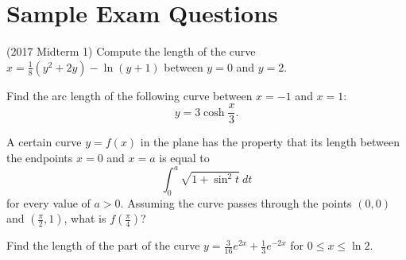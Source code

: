 \documentclass{ximera}
\begin{document}
\section*{Sample Exam Questions}

\begin{question}(2017 Midterm 1)
Compute the length of the curve $x = \frac{1}{8} (y^2 + 2y) - \ln (y+1)$ between $y=0$ and $y = 2$.
\begin{multipleChoice}
\end{multipleChoice}
\end{question}

\begin{question}
 Find the arc length of the following curve between $x=-1$ and $x=1$:
\[ y = 3 \cosh \frac{x}{3}. \]
\begin{multipleChoice}
\end{multipleChoice}
\end{question}

\begin{question}
 A certain curve $y = f(x)$ in the plane has the property that its length between the endpoints $x=0$ and $x=a$ is equal to
\[ \int_0^a \sqrt{1 + \sin^2 t} ~ dt \]
for every value of $a > 0$.  Assuming the curve passes through the points $(0,0)$ and $(\frac{\pi}{2},1)$, what is $f( \frac{\pi}{4})$?
\begin{multipleChoice} 
\end{multipleChoice}
\end{question}

\begin{question}%

Find the length of the part of the curve \(\displaystyle y = \frac{3}{16} e^{2x} + \frac{1}{3} e^{-2x}\) for \(0 \leq x \leq \ln 2\).
\begin{multiplechoice}
\end{multiplechoice}

\end{question}
\end{document}
